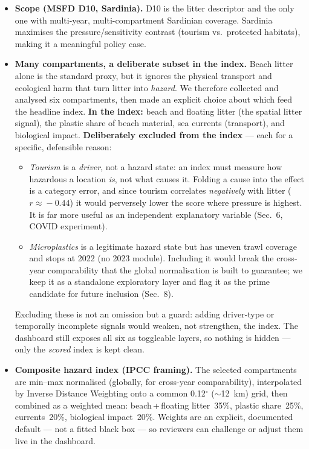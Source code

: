 \documentclass[11pt,a4paper]{article}
\begin{document}
\begin{itemize}
\item \textbf{Scope (MSFD D10, Sardinia).} D10 is the litter descriptor and the only one with
multi-year, multi-compartment Sardinian coverage. Sardinia maximises the pressure/sensitivity
contrast (tourism vs.\ protected habitats), making it a meaningful policy case.

\item \textbf{Many compartments, a deliberate subset in the index.} Beach litter alone is the
standard proxy, but it ignores the physical transport and ecological harm that turn litter into
\emph{hazard}. We therefore collected and analysed six compartments, then made an explicit choice
about which feed the headline index. \textbf{In the index:} beach and floating litter (the spatial
litter signal), the plastic share of beach material, sea currents (transport), and biological
impact. \textbf{Deliberately excluded from the index} --- each for a specific, defensible reason:
\begin{itemize}
\item \textit{Tourism} is a \emph{driver}, not a hazard state: an index must measure how hazardous
a location \emph{is}, not what causes it. Folding a cause into the effect is a category error, and
since tourism correlates \emph{negatively} with litter ($r\!\approx\!-0.44$) it would perversely
lower the score where pressure is highest. It is far more useful as an independent explanatory
variable (Sec.~6, COVID experiment).
\item \textit{Microplastics} is a legitimate hazard state but has uneven trawl coverage and stops
at 2022 (no 2023 module). Including it would break the cross-year comparability that the global
normalisation is built to guarantee; we keep it as a standalone exploratory layer and flag it as
the prime candidate for future inclusion (Sec.~8).
\end{itemize}
Excluding these is not an omission but a guard: adding driver-type or temporally incomplete
signals would weaken, not strengthen, the index. The dashboard still exposes all six as
toggleable layers, so nothing is hidden --- only the \emph{scored} index is kept clean.

\item \textbf{Composite hazard index (IPCC framing).} The selected compartments are min--max
normalised (globally, for cross-year comparability), interpolated by Inverse Distance Weighting onto
a common 0.12$^{\circ}$ ($\sim$12~km) grid, then combined as a weighted mean: beach\,+\,floating
litter~35\%, plastic share~25\%, currents~20\%, biological impact~20\%. Weights are an explicit,
documented default --- not a fitted black box --- so reviewers can challenge or adjust them live in
the dashboard.


\end{itemize}
\end{document}
